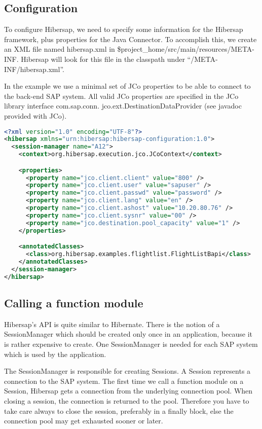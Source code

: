\subsection{Configuration}

To configure Hibersap, we need to specify some information for the Hibersap framework, plus properties for the Java Connector. To accomplish this, we create an XML file named hibersap.xml in \$project\_home/src/main/resources/META-INF. Hibersap will look for this file in the classpath under ``/META-INF/hibersap.xml''.

In the example we use a minimal set of JCo properties to be able to connect to the back-end SAP system.
All valid JCo properties are specified in the JCo library interface com.sap.conn. jco.ext.DestinationDataProvider (see
javadoc provided with JCo).

\begin{lstlisting}[language=XML,caption=hibersap.xml]
<?xml version="1.0" encoding="UTF-8"?>
<hibersap xmlns="urn:hibersap:hibersap-configuration:1.0">
  <session-manager name="A12">
    <context>org.hibersap.execution.jco.JCoContext</context>

    <properties>
      <property name="jco.client.client" value="800" />
      <property name="jco.client.user" value="sapuser" />
      <property name="jco.client.passwd" value="password" />
      <property name="jco.client.lang" value="en" />
      <property name="jco.client.ashost" value="10.20.80.76" />
      <property name="jco.client.sysnr" value="00" />
      <property name="jco.destination.pool_capacity" value="1" />
    </properties>

    <annotatedClasses>
      <class>org.hibersap.examples.flightlist.FlightListBapi</class>
    </annotatedClasses>
  </session-manager>
</hibersap>
\end{lstlisting}

\subsection{Calling a function module}

Hibersap's API is quite similar to Hibernate.
There is the notion of a SessionManager which should be created only once in an application,
because it is rather expensive to create.
One SessionManager is needed for each SAP system which is used by the application.

The SessionManager is responsible for creating Sessions.
A Session represents a connection to the SAP system. The first time we call a function module
on a Session, Hibersap gets a connection from the underlying connection pool.
When closing a session, the connection is returned to the pool. Therefore you have to take care
always to close the session, preferably in a finally block, else the connection pool may
get exhausted sooner or later.

